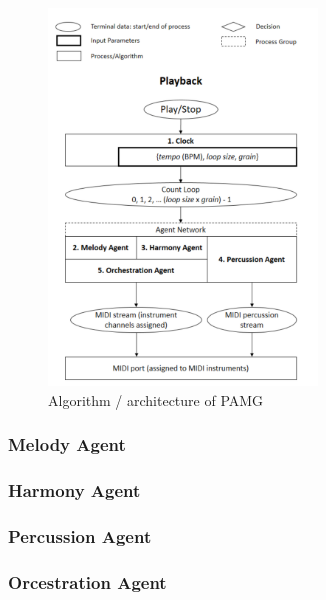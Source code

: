 \begin{figure}[h]
    \centering
    \includegraphics[width=\linewidth,height=10cm]{images/pamg_algorithm.png}
    \caption{Algorithm / architecture of PAMG \cite{lopez2023progressive}}
    \label{fig:pamg_algorithm}
\end{figure}


\subsubsection{Melody Agent}

\subsubsection{Harmony Agent}

\subsubsection{Percussion Agent}

\subsubsection{Orcestration Agent}